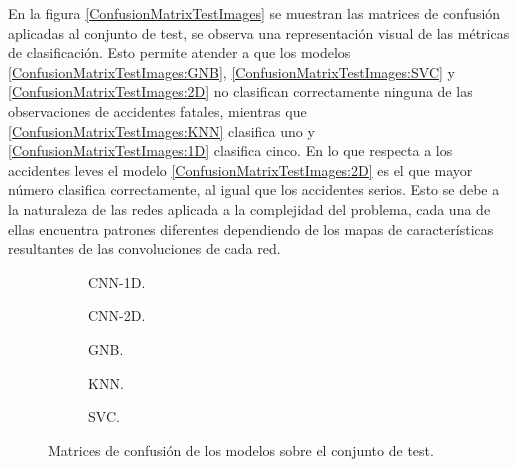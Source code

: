     En la figura \eqref{ConfusionMatrixTestImages} se muestran las matrices de confusión aplicadas al conjunto de test, se observa una representación visual de las métricas de clasificación. Esto permite atender a que los modelos  \eqref{ConfusionMatrixTestImages:GNB},  \eqref{ConfusionMatrixTestImages:SVC} y  \eqref{ConfusionMatrixTestImages:2D} no clasifican correctamente ninguna de las observaciones de accidentes fatales, mientras que  \eqref{ConfusionMatrixTestImages:KNN} clasifica uno y  \eqref{ConfusionMatrixTestImages:1D} clasifica cinco. En lo que respecta a los accidentes leves el modelo  \eqref{ConfusionMatrixTestImages:2D} es el que mayor número clasifica correctamente, al igual que los accidentes serios. Esto se debe a la naturaleza de las redes aplicada a la complejidad del problema, cada una de ellas encuentra patrones diferentes dependiendo de los mapas de características resultantes de las convoluciones de cada red.

    \begin{figure}[H]
        \centering
        \begin{subfigure}{0.4\textwidth}
            
            \caption{CNN-1D.}
            \label{ConfusionMatrixTestImages:1D}
        \end{subfigure}
        \hspace{3em}
        \begin{subfigure}[b]{0.4\textwidth}
            
            \caption{CNN-2D.} 
            \label{ConfusionMatrixTestImages:2D}
        \end{subfigure}
        \vspace*{0.5 cm}
        \begin{subfigure}[b]{0.4\textwidth}
            
            \caption{GNB.}
            \label{ConfusionMatrixTestImages:GNB}
        \end{subfigure}
        \hspace{3em}
        \begin{subfigure}[b]{0.4\textwidth}
            
            \caption{KNN.}
            \label{ConfusionMatrixTestImages:KNN}
        \end{subfigure}
        \vspace*{0.5 cm}
        \begin{subfigure}[b]{0.4\textwidth}
            
            \caption{SVC.}
            \label{ConfusionMatrixTestImages:SVC}
        \end{subfigure}

        \caption{Matrices de confusión de los modelos sobre el conjunto de test.}
        \label{ConfusionMatrixTestImages}
     \end{figure}

